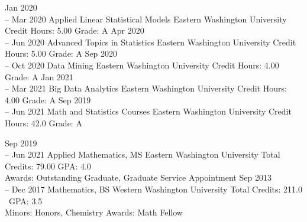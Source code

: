 \documentclass[11pt]{developercv} %
\begin{document}


\begin{entrylist}
	\entry
		{Jan 2020 \\
		-- Mar 2020}
		{Applied Linear Statistical Models}
		{Eastern Washington University}
		{Credit Hours: 5.00 \qquad Grade: A}
	\entry
		{Apr 2020 \\
		-- Jun 2020}
		{Advanced Topics in Statistics}
		{Eastern Washington University}
		{Credit Hours: 5.00 \qquad Grade: A}
	\entry
		{Sep 2020 \\
		-- Oct 2020}
		{Data Mining}
		{Eastern Washington University}
		{Credit Hours: 4.00 \qquad Grade: A}
	\entry
		{Jan 2021 \\
		-- Mar 2021}
		{Big Data Analytics}
		{Eastern Washington University}
		{Credit Hours: 4.00 \qquad Grade: A}
	\entry
		{Sep 2019 \\
		-- Jun 2021}
		{Math and Statistics Courses}
		{Eastern Washington University}
		{Credit Hours: 42.0 \qquad Grade: A}
\end{entrylist}



\begin{entrylist}
	\entry
		{Sep 2019\\
		-- Jun 2021}
		{Applied Mathematics, MS}
		{Eastern Washington University}
		{Total Credits: 79.00 \qquad GPA: 4.0 \\
		Awards: Outstanding Graduate, Graduate Service Appointment
		}
	\entry
		{Sep 2013\\
		-- Dec 2017}
		{Mathematics, BS}
		{Western Washington University}
		{Total Credits: 211.0 \qquad \ GPA: 3.5 \\
		Minors: Honors, Chemistry
		Awards: Math Fellow
		}
\end{entrylist}
\end{document}
